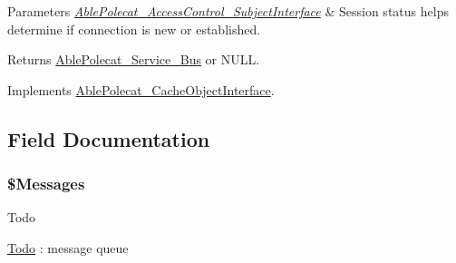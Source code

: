 \begin{DoxyParams}{Parameters}
{\em \hyperlink{interface_able_polecat___access_control___subject_interface}{Able\+Polecat\+\_\+\+Access\+Control\+\_\+\+Subject\+Interface}} & Session status helps determine if connection is new or established.\\
\hline
\end{DoxyParams}
\begin{DoxyReturn}{Returns}
\hyperlink{class_able_polecat___service___bus}{Able\+Polecat\+\_\+\+Service\+\_\+\+Bus} or N\+U\+L\+L. 
\end{DoxyReturn}


Implements \hyperlink{interface_able_polecat___cache_object_interface_a3f2135f6ad45f51d075657f6d20db2cd}{Able\+Polecat\+\_\+\+Cache\+Object\+Interface}.



\subsection{Field Documentation}
\hypertarget{class_able_polecat___service___bus_aae046bbb8c846e4d0a266db8991fa7a7}{}
\subsubsection[{\$\+Messages}]{\setlength{\rightskip}{0pt plus 5cm}\$Messages\hspace{0.3cm}{\ttfamily [protected]}}\label{class_able_polecat___service___bus_aae046bbb8c846e4d0a266db8991fa7a7}
\begin{DoxyRefDesc}{Todo}
\item[\hyperlink{todo__todo000012}{Todo}]\+: message queue \end{DoxyRefDesc}
\hypertarget{class_able_polecat___service___bus_a6812e1b07c5d6333a734e863afdd3231}{}
